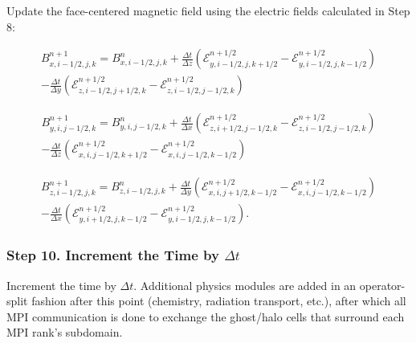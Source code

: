 \documentclass[modern, linenumbers]{aastex631}
\begin{document}
Update the face-centered magnetic field using the electric fields calculated in Step 8:

\begin{equation}
    \begin{aligned}
        B^{n+1}_{x,i-1/2,j,k} = B^{n}_{x,i-1/2,j,k}
        + \frac{\Delta t}{\Delta z} \left( \mathcal{E}^{n+1/2}_{y,i-1/2,j,k+1/2} - \mathcal{E}^{n+1/2}_{y,i-1/2,j,k-1/2} \right) \\
        - \frac{\Delta t}{\Delta y} \left( \mathcal{E}^{n+1/2}_{z,i-1/2,j+1/2,k} - \mathcal{E}^{n+1/2}_{z,i-1/2,j-1/2,k} \right)
    \end{aligned}
\end{equation}

\begin{equation}
    \begin{aligned}
        B^{n+1}_{y,i,j-1/2,k} = B^{n}_{y,i,j-1/2,k}
        + \frac{\Delta t}{\Delta x} \left( \mathcal{E}^{n+1/2}_{z,i+1/2,j-1/2,k} - \mathcal{E}^{n+1/2}_{z,i-1/2,j-1/2,k} \right) \\
        - \frac{\Delta t}{\Delta z} \left( \mathcal{E}^{n+1/2}_{x,i,j-1/2,k+1/2} - \mathcal{E}^{n+1/2}_{x,i,j-1/2,k-1/2} \right)
    \end{aligned}
\end{equation}

\begin{equation}
    \begin{aligned}
        B^{n+1}_{z,i-1/2,j,k} = B^{n}_{z,i-1/2,j,k}
        + \frac{\Delta t}{\Delta y} \left( \mathcal{E}^{n+1/2}_{x,i,j+1/2,k-1/2} - \mathcal{E}^{n+1/2}_{x,i,j-1/2,k-1/2} \right) \\
        - \frac{\Delta t}{\Delta x} \left( \mathcal{E}^{n+1/2}_{y,i+1/2,j,k-1/2} - \mathcal{E}^{n+1/2}_{y,i-1/2,j,k-1/2} \right).
    \end{aligned}
\end{equation}

\subsubsection{Step 10. Increment the Time by \texorpdfstring{$\Delta t$}{dt}}
\label{vlct:increment-time}

Increment the time by $\Delta t$. Additional physics modules are added in an operator-split fashion after this point (chemistry, radiation transport, etc.), after which all MPI communication is done to exchange the ghost/halo cells that surround each MPI rank's subdomain.
\end{document}
